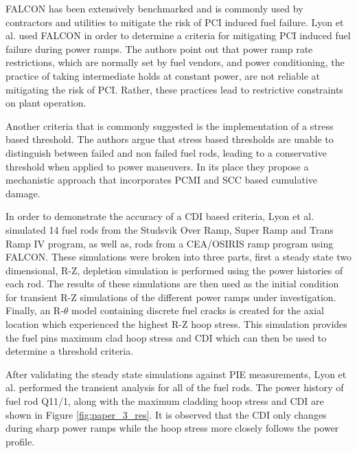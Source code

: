 \documentclass[edeposit,fullpage]{uiucthesis2009}
\begin{document}
FALCON has been extensively benchmarked and is commonly used by contractors and utilities to mitigate the risk of \gls{PCI} induced fuel failure.
Lyon et al. \cite{lyon_pci_2009} used FALCON in order to determine a criteria for mitigating \gls{PCI} induced fuel failure during power ramps.
The authors point out that power ramp rate restrictions, which are normally set by fuel vendors, and power conditioning, the practice of taking intermediate holds at constant power, are not reliable at mitigating the risk of \gls{PCI}. 
Rather, these practices lead to restrictive constraints on plant operation.

Another criteria that is commonly suggested is the implementation of a stress based threshold.
The authors argue that stress based thresholds are unable to distinguish between failed and non failed fuel rods, leading to a conservative threshold when applied to power maneuvers.
In its place they propose a mechanistic approach that incorporates \gls{PCMI} and \gls{SCC} based cumulative damage.

%
%
%

In order to demonstrate the accuracy of a \gls{CDI} based criteria, Lyon et al. simulated 14 fuel rods from the Studsvik Over Ramp, Super Ramp and Trans Ramp IV program, as well as, rods from a CEA/OSIRIS ramp program using FALCON.
These simulations were broken into three parts, first a steady state two dimensional, R-Z, depletion simulation is performed using the power histories of each rod.
The results of these simulations are then used as the initial condition for transient R-Z simulations of the different power ramps under investigation.
Finally, an R-$\theta$ model containing discrete fuel cracks is created for the axial location which experienced the highest R-Z hoop stress.
This simulation provides the fuel pins maximum clad hoop stress and \gls{CDI} which can then be used to determine a threshold criteria.

After validating the steady state simulations against \gls{PIE} measurements, Lyon et al. performed the transient analysis for all of the fuel rods. 
The power history of fuel rod Q11/1, along with the maximum cladding hoop stress and \gls{CDI} are shown in Figure \ref{fig:paper_3_res}.
It is observed that the \gls{CDI} only changes during sharp power ramps while the hoop stress more closely follows the power profile.
\end{document}

